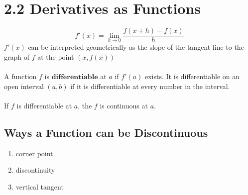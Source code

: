 %
%

\section*{2.2 Derivatives as Functions}

$$f'(x)=\lim_{h \to 0}\frac{f(x+h)-f(x)}{h}$$
\(f'(x)\) can be interpreted geometrically as the slope of the tangent line to the graph of \(f\) at the point \((x, f(x))\)
\\\\
A function \(f\) is \(\textbf{differentiable}\) at \(a\) if \(f'(a)\) exists. It is differentiable on an open interval \((a,b)\) if it is differentiable at every number in the interval.
\\\\
If \(f\) is differentiable at \(a\), the \(f\) is continuous at \(a\).

\subsection*{Ways a Function can be Discontinuous}

\begin{enumerate}
    \item corner point
    \item discontinuity
    \item vertical tangent
\end{enumerate}

